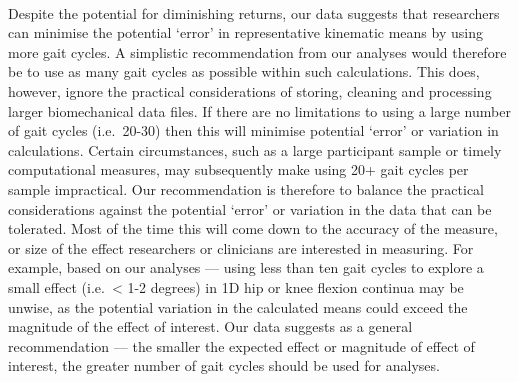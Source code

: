 \documentclass[]{elsarticle} %
\begin{document}
~

Despite the potential for diminishing returns, our data suggests that
researchers can minimise the potential `error' in representative
kinematic means by using more gait cycles. A simplistic recommendation
from our analyses would therefore be to use as many gait cycles as
possible within such calculations. This does, however, ignore the
practical considerations of storing, cleaning and processing larger
biomechanical data files. If there are no limitations to using a large
number of gait cycles (i.e.~20-30) then this will minimise potential
`error' or variation in calculations. Certain circumstances, such as a
large participant sample or timely computational measures, may
subsequently make using 20+ gait cycles per sample impractical. Our
recommendation is therefore to balance the practical considerations
against the potential `error' or variation in the data that can be
tolerated. Most of the time this will come down to the accuracy of the
measure, or size of the effect researchers or clinicians are interested
in measuring. For example, based on our analyses --- using less than ten
gait cycles to explore a small effect (i.e.~\textless{} 1-2 degrees) in
1D hip or knee flexion continua may be unwise, as the potential
variation in the calculated means could exceed the magnitude of the
effect of interest. Our data suggests as a general recommendation ---
the smaller the expected effect or magnitude of effect of interest, the
greater number of gait cycles should be used for analyses.

~
\end{document}
